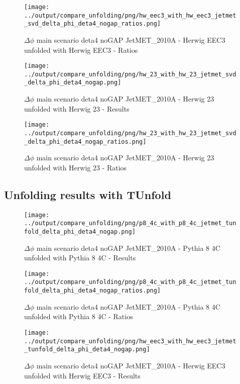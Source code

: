 \documentclass[11pt]{book}
\begin{document}
\begin{figure}[ht]
\centering
\texttt{[image: ../output/compare\_unfolding/png/hw\_eec3\_with\_hw\_eec3\_jetmet\_svd\_delta\_phi\_deta4\_nogap\_ratios.png]}
\caption{$\Delta\phi$ main scenario deta4 noGAP JetMET\_2010A - Herwig EEC3 unfolded with Herwig EEC3 - Ratios}
\label{hw_eec3_hw_eec3_jetmet_svd_delta_phi_deta4_nogap_b}
\end{figure}

\begin{figure}[ht]
\centering
\texttt{[image: ../output/compare\_unfolding/png/hw\_23\_with\_hw\_23\_jetmet\_svd\_delta\_phi\_deta4\_nogap.png]}
\caption{$\Delta\phi$ main scenario deta4 noGAP JetMET\_2010A - Herwig 23 unfolded with Herwig 23 - Results}
\label{hw_23_hw_23_jetmet_svd_delta_phi_deta4_nogap_a}
\end{figure}

\begin{figure}[ht]
\centering
\texttt{[image: ../output/compare\_unfolding/png/hw\_23\_with\_hw\_23\_jetmet\_svd\_delta\_phi\_deta4\_nogap\_ratios.png]}
\caption{$\Delta\phi$ main scenario deta4 noGAP JetMET\_2010A - Herwig 23 unfolded with Herwig 23 - Ratios}
\label{hw_23_hw_23_jetmet_svd_delta_phi_deta4_nogap_b}
\end{figure}


\clearpage
\subsection{Unfolding results with TUnfold}

\begin{figure}[ht]
\centering
\texttt{[image: ../output/compare\_unfolding/png/p8\_4c\_with\_p8\_4c\_jetmet\_tunfold\_delta\_phi\_deta4\_nogap.png]}
\caption{$\Delta\phi$ main scenario deta4 noGAP JetMET\_2010A - Pythia 8 4C unfolded with Pythia 8 4C - Results}
\label{p8_p8_jetmet_tunfold_delta_phi_deta4_nogap_a}
\end{figure}

\begin{figure}[ht]
\centering
\texttt{[image: ../output/compare\_unfolding/png/p8\_4c\_with\_p8\_4c\_jetmet\_tunfold\_delta\_phi\_deta4\_nogap\_ratios.png]}
\caption{$\Delta\phi$ main scenario deta4 noGAP JetMET\_2010A - Pythia 8 4C unfolded with Pythia 8 4C - Ratios}
\label{p8_p8_jetmet_tunfold_delta_phi_deta4_nogap_b}
\end{figure}

\begin{figure}[ht]
\centering
\texttt{[image: ../output/compare\_unfolding/png/hw\_eec3\_with\_hw\_eec3\_jetmet\_tunfold\_delta\_phi\_deta4\_nogap.png]}
\caption{$\Delta\phi$ main scenario deta4 noGAP JetMET\_2010A - Herwig EEC3 unfolded with Herwig EEC3 - Results}
\label{hw_eec3_hw_eec3_jetmet_tunfold_delta_phi_deta4_nogap_a}
\end{figure}
\end{document}
